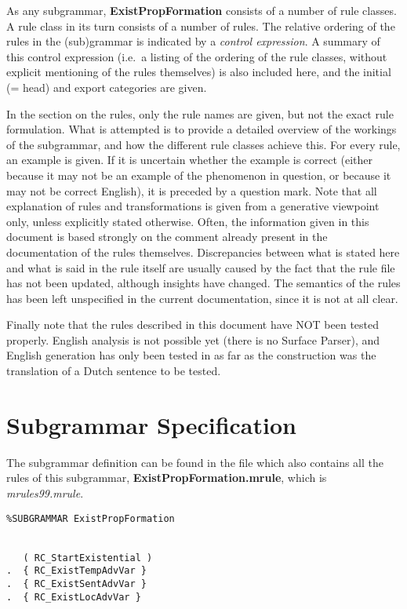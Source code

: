 As any subgrammar, {\bf ExistPropFormation} consists of 
a number of rule classes. A rule class in its turn
consists of a number of rules. The relative ordering of the rules in the
(sub)grammar is indicated by a {\em control expression}. A summary of this
control expression (i.e.\ a listing of the ordering of the rule classes, 
without explicit mentioning of the rules themselves) is also included here, 
and the initial (= head) and export categories are given. 

In the section on the rules, only the rule names are given, 
but not the exact rule formulation. What is attempted 
is to provide a detailed overview of the workings of the subgrammar, and 
how the different rule classes achieve this. For every rule, an 
example is given. If it is uncertain whether the example is correct (either 
because it may not be an example of the phenomenon in question, or because it 
may not be correct English), it is preceded by a question mark. Note that all 
explanation of rules and transformations is given from a generative viewpoint
only, unless explicitly stated otherwise. Often, the information given in this 
document is based strongly on the comment already present in the documentation 
of the rules themselves. Discrepancies between what is stated here and what is 
said in the rule itself are usually caused by the fact that the rule file has 
not  been updated, although insights have changed. The semantics of the rules 
has been left unspecified in the current documentation, since it is not at all 
clear.

Finally note that the rules described in this document have NOT been tested 
properly. English analysis is not possible yet (there is no Surface Parser), and 
English generation has only been tested in as far as the construction was the 
translation of a Dutch sentence to be tested.

\newpage
\section{Subgrammar Specification}
The subgrammar definition can be found in the file which also contains all the 
rules of this subgrammar, {\bf ExistPropFormation.mrule}, which is 
{\em mrules99.mrule\/}.

\begin{verbatim}
%SUBGRAMMAR ExistPropFormation


   ( RC_StartExistential )
.  { RC_ExistTempAdvVar }
.  { RC_ExistSentAdvVar }
.  { RC_ExistLocAdvVar }

\end{verbatim}

